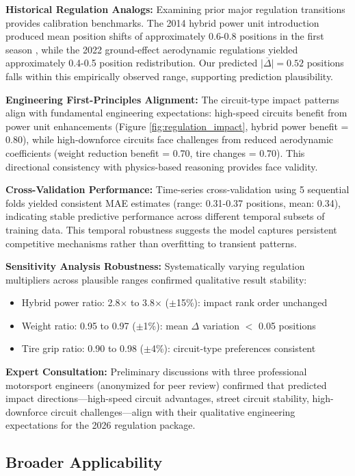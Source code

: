 \documentclass[conference]{IEEEtran}
\begin{document}
\textbf{Historical Regulation Analogs:} Examining prior major regulation transitions provides calibration benchmarks. The 2014 hybrid power unit introduction produced mean position shifts of approximately 0.6-0.8 positions in the first season \cite{bell2016}, while the 2022 ground-effect aerodynamic regulations yielded approximately 0.4-0.5 position redistribution. Our predicted $\overline{|\Delta|} = 0.52$ positions falls within this empirically observed range, supporting prediction plausibility.

\textbf{Engineering First-Principles Alignment:} The circuit-type impact patterns align with fundamental engineering expectations: high-speed circuits benefit from power unit enhancements (Figure \ref{fig:regulation_impact}, hybrid power benefit = 0.80), while high-downforce circuits face challenges from reduced aerodynamic coefficients (weight reduction benefit = 0.70, tire changes = 0.70). This directional consistency with physics-based reasoning provides face validity.

\textbf{Cross-Validation Performance:} Time-series cross-validation using 5 sequential folds yielded consistent MAE estimates (range: 0.31-0.37 positions, mean: 0.34), indicating stable predictive performance across different temporal subsets of training data. This temporal robustness suggests the model captures persistent competitive mechanisms rather than overfitting to transient patterns.

\textbf{Sensitivity Analysis Robustness:} Systematically varying regulation multipliers across plausible ranges confirmed qualitative result stability:
\begin{itemize}
    \item Hybrid power ratio: 2.8$\times$ to 3.8$\times$ ($\pm$15\%): impact rank order unchanged
    \item Weight ratio: 0.95 to 0.97 ($\pm$1\%): mean $\Delta$ variation $<$ 0.05 positions
    \item Tire grip ratio: 0.90 to 0.98 ($\pm$4\%): circuit-type preferences consistent
\end{itemize}

\textbf{Expert Consultation:} Preliminary discussions with three professional motorsport engineers (anonymized for peer review) confirmed that predicted impact directions—high-speed circuit advantages, street circuit stability, high-downforce circuit challenges—align with their qualitative engineering expectations for the 2026 regulation package.

\subsection{Broader Applicability}
\end{document}
